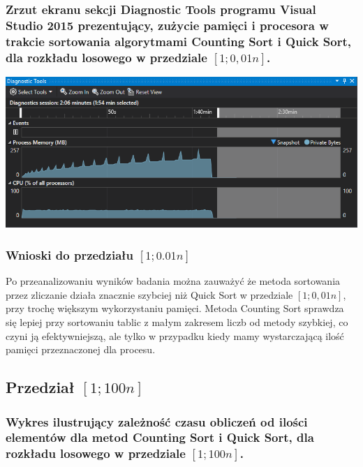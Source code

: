 \documentclass[polish,polish,a4paper]{article}
\begin{document}
\begin{spacing}{1.5}
\subsubsection*{Zrzut ekranu sekcji Diagnostic Tools programu Visual Studio 2015 prezentujący, zużycie pamięci i procesora w trakcie sortowania algorytmami Counting Sort i  Quick Sort, dla rozkładu losowego w przedziale $[1;0,01n]$.}

	\begin{minipage}[H]{\textwidth}
	\begin{center}
		\includegraphics[scale=0.85]{zad4pamiec001n.png}
		\label{fig:zad4pamiec001n}
	\end{center}
	\end{minipage}

\subsubsection{Wnioski do przedziału $[1;0.01n]$}

Po przeanalizowaniu wyników badania można zauważyć że metoda sortowania przez zliczanie działa znacznie szybciej niż Quick Sort w przedziale $[1;0,01n]$, przy trochę większym wykorzystaniu pamięci. Metoda Counting Sort sprawdza się lepiej przy sortowaniu tablic z małym zakresem liczb od metody szybkiej, co czyni ją efektywniejszą, ale tylko w przypadku kiedy mamy wystarczającą ilość pamięci przeznaczonej dla procesu.

\subsection{Przedział $[1;100n]$}

\subsubsection*{Wykres ilustrujący zależność czasu obliczeń od ilości elementów dla metod Counting Sort i  Quick Sort, dla rozkładu losowego w przedziale $[1;100n]$.}


\end{spacing}
\end{document}
